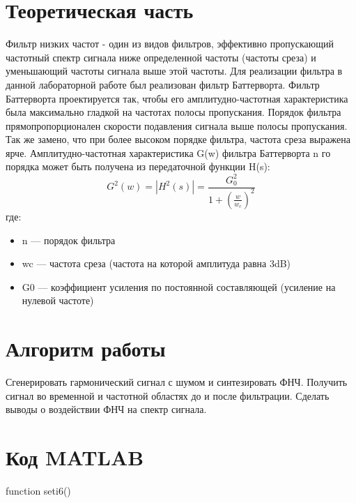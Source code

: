 \documentclass[10pt,a4paper]{report}
\begin{document}
\section{Теоретическая часть}
Фильтр низких частот - один из видов фильтров, эффективно пропускающий частотный спектр сигнала ниже определенной частоты (частоты среза) и уменьшающий частоты сигнала выше этой частоты. Для реализации фильтра в данной лабораторной работе был реализован фильтр Баттерворта. Фильтр Баттерворта проектируется так, чтобы его амплитудно-частотная характеристика была максимально гладкой на частотах полосы пропускания. Порядок фильтра прямопропорционален скорости подавления сигнала выше полосы пропускания. Так же замено, что при более высоком порядке фильтра, частота среза выражена ярче. Амплитудно-частотная характеристика G(w) фильтра Баттерворта n го порядка может быть получена из передаточной функции H(s):
\begin{displaymath}
	G^2(w) = |H^2(s)| = \frac{G_0^2}{1+(\frac{w}{w_c})^2}
\end{displaymath}
где:
\begin{itemize}
\item n — порядок фильтра
\item wc — частота среза (частота на которой амплитуда равна 3dB)
\item G0 — коэффициент усиления по постоянной составляющей (усиление на нулевой частоте)
\end{itemize}
\section{Алгоритм работы}
Сгенерировать гармонический сигнал с шумом и синтезировать ФНЧ. Получить сигнал во временной и частотной областях до и после фильтрации. Сделать выводы о воздействии ФНЧ на  спектр сигнала.
\section{Код MATLAB}
function seti6() \newline
\end{document}
